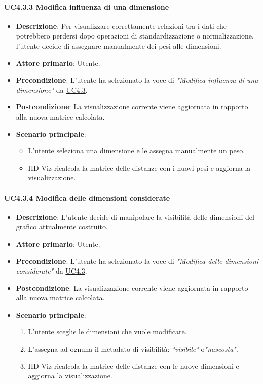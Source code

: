 \paragraph{UC4.3.3 Modifica influenza di una dimensione}
\label{par:uc4.3.3}
\begin{itemize}
    \item \textbf{Descrizione}: Per visualizzare correttamente relazioni tra i dati che 
                                potrebbero perdersi dopo operazioni di standardizzazione o normalizzazione,
                                l’utente decide di assegnare manualmente dei pesi alle dimensioni.

    \item \textbf{Attore primario}: Utente.
    \item \textbf{Precondizione}: L'utente ha selezionato la voce di \emph{"Modifica influenza di una dimensione"} da \hyperref[ssub:uc4.3]{UC4.3}.

    \item \textbf{Postcondizione}: La visualizzazione corrente viene aggiornata in rapporto alla nuova matrice calcolata.
    \item \textbf{Scenario principale}:  
    \begin{itemize}
        \item L’utente seleziona una dimensione e le assegna manualmente un peso.
        \item HD Viz ricalcola la matrice delle distanze con i nuovi pesi e aggiorna la visualizzazione.
    \end{itemize}
\end{itemize}

\paragraph{UC4.3.4 Modifica delle dimensioni considerate}
\label{par:uc4.3.4}
\begin{itemize}
    \item \textbf{Descrizione}: L'utente decide di manipolare la visibilità delle dimensioni 
                                del grafico attualmente costruito.
    \item \textbf{Attore primario}: Utente.
    \item \textbf{Precondizione}: L'utente ha selezionato la voce di \emph{"Modifica delle dimensioni considerate"} da \hyperref[ssub:uc4.3]{UC4.3}.
    \item \textbf{Postcondizione}: La visualizzazione corrente viene aggiornata in rapporto alla nuova matrice calcolata.
    \item \textbf{Scenario principale}:
    \begin{enumerate}
        \item L'utente sceglie le dimensioni che vuole modificare. 
        \item L'assegna ad ognuna il metadato di visibilità: \emph{"visibile"} o\emph{"nascosta"}.
        \item HD Viz ricalcola la matrice delle distanze con le nuove dimensioni e aggiorna la visualizzazione.
    \end{enumerate}
\end{itemize}

